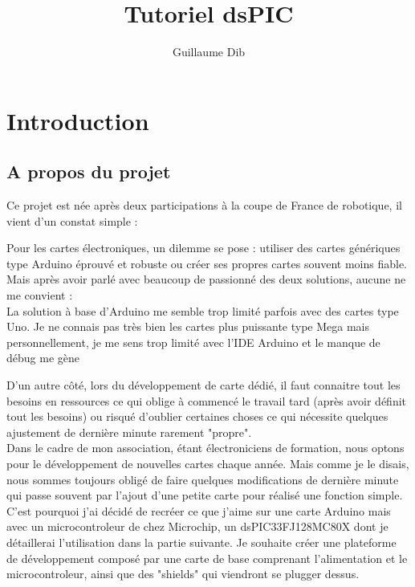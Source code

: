 \documentclass[a4paper]{article}
\author{Guillaume Dib}
\title{Tutoriel dsPIC}
\begin{document}
 \maketitle
\clearpage
\tableofcontents
\clearpage

\section{Introduction} 
	\subsection{A propos du projet}

Ce projet est née après deux participations à la coupe de France de robotique, il vient d'un constat simple :

Pour les cartes électroniques, un dilemme se pose : utiliser des cartes génériques type Arduino éprouvé et robuste ou créer ses propres cartes souvent moins fiable.\\

Mais après avoir parlé avec beaucoup de passionné des deux solutions, aucune ne me convient :\\
 La solution à base d'Arduino me semble trop limité parfois avec des cartes type Uno. Je ne connais pas très bien les cartes plus puissante type Mega mais personnellement, je me sens trop limité avec l'IDE Arduino et le manque de débug me gène
 
 D'un autre côté, lors du développement de carte dédié, il faut connaitre tout les besoins en ressources ce qui oblige à commencé le travail tard (après avoir définit tout les besoins) ou risqué d'oublier certaines choses ce qui nécessite quelques ajustement de dernière minute rarement "propre".\\
 
 Dans le cadre de mon association, étant électroniciens de formation, nous optons pour le développement de nouvelles cartes chaque année. Mais comme je le disais, nous sommes toujours obligé de faire quelques modifications de dernière minute qui passe souvent par l'ajout d'une petite carte pour réalisé une fonction simple.\\
 
 C'est pourquoi j'ai décidé de recréer ce que j'aime sur une carte Arduino mais avec un microcontroleur de chez Microchip, un dsPIC33FJ128MC80X dont je détaillerai l'utilisation dans la partie suivante. Je souhaite créer une plateforme de développement composé par une carte de base comprenant l'alimentation et le microcontroleur, ainsi que des "shields" qui viendront se plugger dessus. 
 
\end{document}
